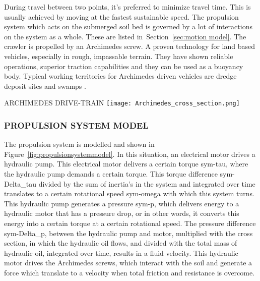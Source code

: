 During travel between two points, it's preferred to minimize travel time. This is usually achieved by moving at the 
fastest sustainable speed. The propulsion system which acts on the submerged soil bed is governed by a lot of 
interactions on the system as a whole. These are listed in~Section~\ref{sec:motion model}. The crawler is propelled 
by an Archimedes screw. A proven technology for land based vehicles, especially in rough, impassable terrain. They 
have shown reliable operations, superior traction capabilities and they can be used as a buoyancy body. Typical 
working territories for Archimedes driven vehicles are dredge deposit sites and swamps \cite{lotman_deep_2011}.

\begin{RoyalFigure}[!htb, label=fig:archimedes_drive_train]{ARCHIMEDES DRIVE-TRAIN}
    \texttt{[image: Archimedes\_cross\_section.png]}
\end{RoyalFigure}

\subsubsection{PROPULSION SYSTEM MODEL}

The propulsion system is modelled and shown in Figure~\ref{fig:propulsionsystemmodel}. In this situation, an
electrical motor drives a hydraulic pump. This electrical motor delivers a certain torque \gls{sym-tau}, where the
hydraulic pump demands a certain torque. This torque difference \gls{sym-Delta_tau} divided by the sum of inertia's 
in the system
and
integrated over time translates to a certain rotational speed \gls{sym-omega} with which this system turns. This
hydraulic pump generates a pressure \gls{sym-p}, which delivers energy to a hydraulic motor that has a pressure drop,
or in other words, it converts this energy into a certain torque at a certain rotational speed. The pressure difference
\gls{sym-Delta_p}, between the hydraulic pump and motor, multiplied with the cross section, in which the hydraulic oil
flows, and divided with the total mass of hydraulic oil, integrated over time, results in a fluid velocity. This
hydraulic motor drives the Archimedes screws, which interact with the soil and generate a force which translate to a 
velocity when total friction and resistance is overcome.

